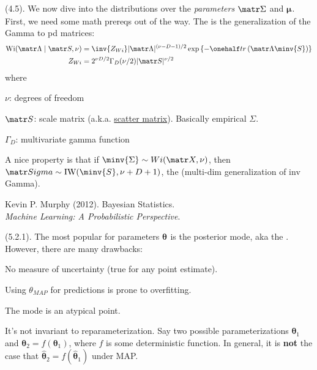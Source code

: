 \documentclass[11pt]{article}
\renewcommand\vec[2][]{\bm{#2}_{#1}}
\newcommand\myspace[1][]{\vspace{#1\bigskipamount}}
\newcommand\p{\Needspace{10\baselineskip} \noindent}
\begin{document}
\myspace
\p {} (4.5). We now dive into the distributions over the \textit{parameters} $\matr\Sigma$ and $\vec\mu$. First, we need some math prereqs out of the way. The  is the generalization of the Gamma to pd matrices:
\begin{align}
	\text{Wi}(\matr\Lambda \mid \matr S, \nu)
		&= \inv{Z_{Wi}} | \matr\Lambda |^{(\nu - D - 1) / 2} \exp\left\{ - \onehalf tr\left(  \matr\Lambda \minv{S} \right) \right\} \\
	Z_{Wi} 
		&= 2^{\nu D / 2 } \Gamma_D(\nu / 2) | \matr S |^{\nu/2}
\end{align}
where
\begin{compactitem}
	\item $\nu$: degrees of freedom
	
	\item $\matr S$: scale matrix (a.k.a. \href{https://www.wikiwand.com/en/Scatter_matrix}{scatter matrix}). Basically empirical $\Sigma$. 
	
	\item $\Gamma_D$: multivariate gamma function
\end{compactitem}
A nice property is that if $\minv{\Sigma} \sim Wi(\matr X, \nu)$, then $\matr Sigma \sim \text{IW}(\minv{S}, \nu + D + 1)$, the  (multi-dim generalization of inv Gamma). 







\vspace{-1.7em}
{\scriptsize Kevin P. Murphy (2012). Bayesian Statistics.\\ \textit{Machine Learning: A Probabilistic Perspective}.\\ }

\p {} (5.2.1). The most popular  for parameters $\vec\theta$ is the posterior mode, aka the . However, there are many drawbacks:
\begin{compactitem}
	\item No measure of uncertainty (true for any point estimate). 
	
	\item Using $\theta_{MAP}$ for predictions is prone to overfitting.
	
	\item The mode is an atypical point.
	
	\item It's not invariant to reparameterization. Say two possible parameterizations $\vec[1]{\theta}$ and $\vec[2]{\theta} {=} f(\vec[1]{\theta})$, where $f$ is some deterministic function. In general, it is \textbf{not} the case that $\vec[2]{\hat\theta} = f(\vec[1]{\hat{\theta}})$ under MAP. 
\end{compactitem}
\end{document}
